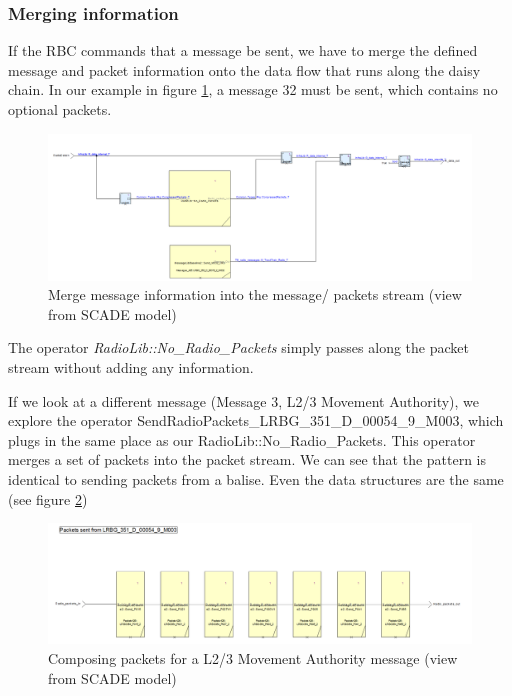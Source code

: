 \documentclass{template/openetcs_article}
\begin{document}
\subsubsection{Merging information}

If the RBC commands that a message be sent, we have to merge the defined message and packet information onto the data flow that runs along the daisy chain. In our example in figure \ref{fig:composeRM}, a message 32 must be sent, which contains no optional packets.
\begin{figure}[H]
  \centering
  \includegraphics[width=\textwidth]{images/composeRM}
   \caption{Merge message information into the message/ packets stream (view from SCADE model)}
  \label{fig:composeRM}
\end{figure}
The operator \emph{RadioLib::No\_Radio\_Packets} simply passes along the packet stream without adding any information. \newline

If we look at a different message (Message 3, L2/3 Movement Authority), we explore the operator SendRadioPackets\_LRBG\_351\_D\_00054\_9\_M003, which plugs in the same place as our RadioLib::No\_Radio\_Packets. This operator merges a set of packets into the packet stream. We can see that the pattern is identical to sending packets from a balise. Even the data structures are the same (see figure \ref{fig:m3})

\begin{figure}[H]
  \centering
  \includegraphics[width=\textwidth]{images/RM3}
   \caption{Composing packets for a L2/3 Movement Authority message (view from SCADE model)}
  \label{fig:m3}
\end{figure}
\end{document}
